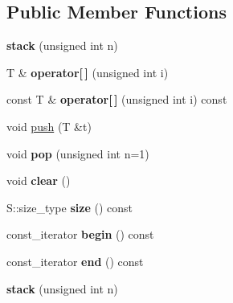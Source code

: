 \subsection*{Public Member Functions}
\begin{DoxyCompactItemize}
\item 
\hypertarget{classyy_1_1stack_af4277ae80177abc36f242c3646cbcfbe}{}{\bfseries stack} (unsigned int n)\label{classyy_1_1stack_af4277ae80177abc36f242c3646cbcfbe}

\item 
\hypertarget{classyy_1_1stack_a1058b8b7e1a3e0aa7b1e6f2f1a62c234}{}T \& {\bfseries operator\mbox{[}$\,$\mbox{]}} (unsigned int i)\label{classyy_1_1stack_a1058b8b7e1a3e0aa7b1e6f2f1a62c234}

\item 
\hypertarget{classyy_1_1stack_a46778e0ee1fd32a559008d5a261df098}{}const T \& {\bfseries operator\mbox{[}$\,$\mbox{]}} (unsigned int i) const \label{classyy_1_1stack_a46778e0ee1fd32a559008d5a261df098}

\item 
void \hyperlink{classyy_1_1stack_acf2b971ffb94c77b56fc0249b55250fa}{push} (T \&t)
\item 
\hypertarget{classyy_1_1stack_a0800c0a796cade80c3ce9a785dc87564}{}void {\bfseries pop} (unsigned int n=1)\label{classyy_1_1stack_a0800c0a796cade80c3ce9a785dc87564}

\item 
\hypertarget{classyy_1_1stack_ae8b2c8309dcdef98210205b1c96b2238}{}void {\bfseries clear} ()\label{classyy_1_1stack_ae8b2c8309dcdef98210205b1c96b2238}

\item 
\hypertarget{classyy_1_1stack_a16f628feeb98a5244ea914c94c160ac4}{}S\+::size\+\_\+type {\bfseries size} () const \label{classyy_1_1stack_a16f628feeb98a5244ea914c94c160ac4}

\item 
\hypertarget{classyy_1_1stack_a3939df081955a4ad78e14eeb9b2b5dbf}{}const\+\_\+iterator {\bfseries begin} () const \label{classyy_1_1stack_a3939df081955a4ad78e14eeb9b2b5dbf}

\item 
\hypertarget{classyy_1_1stack_a27ade5b933a4dc8a27960c88addda2a0}{}const\+\_\+iterator {\bfseries end} () const \label{classyy_1_1stack_a27ade5b933a4dc8a27960c88addda2a0}

\item 
\hypertarget{classyy_1_1stack_af4277ae80177abc36f242c3646cbcfbe}{}{\bfseries stack} (unsigned int n)\label{classyy_1_1stack_af4277ae80177abc36f242c3646cbcfbe}


\end{DoxyCompactItemize}
